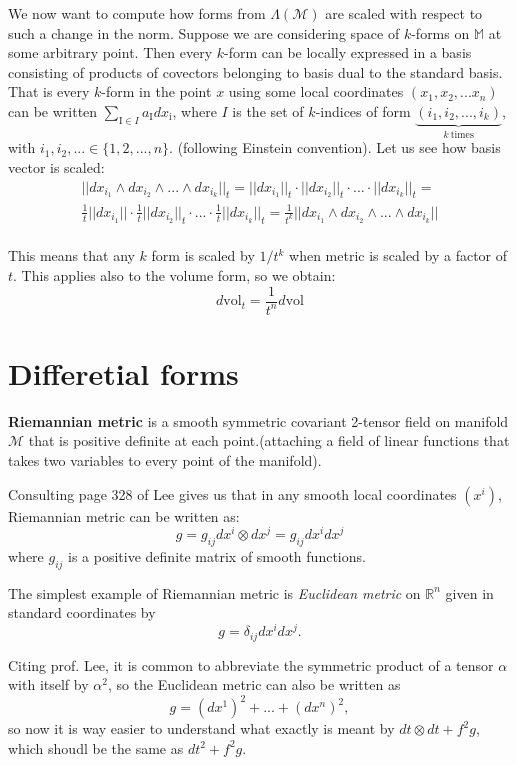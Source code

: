 \documentclass[licencjacka]{pracamgr}
\theoremstyle{definition}
\theoremstyle{definition}
\theoremstyle{plain}
\theoremstyle{plain}
\begin{document}
We now want to compute how forms from $\Lambda(\mathcal{M})$ are scaled
with respect to such a change in the norm. Suppose we are considering
space of $k$-forms on $\mathbb{M}$ at some arbitrary point. Then every
$k$-form can be locally expressed in a basis consisting of products of
covectors belonging to basis dual to the standard basis. That is every
$k$-form in the point $x$ using some local coordinates $(x_1, x_2,
... x_n)$ can be written $ \sum_{\mathrm{I} \in I } a_\mathrm{I}
dx_\mathrm{i}$, where $I$ is the set of $k$-indices of form
$\underbrace{(i_1, i_2, ..., i_k)}_{k~\mathrm{times}}$, with $i_1,
i_2, ... \in \{1, 2, ..., n \}$.  (following Einstein convention).
Let us see how basis vector is scaled:
\begin{multline*}
    ||dx_{i_1} \wedge dx_{i_2} \wedge ... \wedge dx_{i_k} ||_t =  
    ||dx_{i_1} ||_t \cdot ||  dx_{i_2} ||_t \cdot ... \cdot || dx_{i_k} ||_t =  \\
    \frac{1}{t}||dx_{i_1} || \cdot \frac{1}{t} ||  dx_{i_2} ||_t \cdot ...
     \cdot \frac{1}{t} || dx_{i_k} ||_t = 
    \frac{1}{t^k}||dx_{i_1} \wedge dx_{i_2} \wedge ... \wedge dx_{i_k} ||
\end{multline*} \\

This means that any $k$ form is scaled by $1/t^k$ when metric is scaled
by a factor of $t$.
This applies also to the volume form, so we obtain:
\[
d\mathrm{vol}_t = \frac{1}{t^n} d\mathrm{vol}
\]

\section{Differetial forms}

\textbf{Riemannian metric} is a smooth symmetric covariant 2-tensor field
on manifold $\mathcal{M}$ that is positive definite at each point.(attaching
a field of linear functions that takes two variables to every point of the
manifold).

Consulting page 328 of Lee gives us that in any smooth local coordinates
$(x^i)$, Riemannian metric can be written as:
\[
    g = g_{ij} dx^i \otimes dx^j = g_{ij} dx^i dx^j
\]
where $g_{ij}$ is a positive definite matrix of smooth functions. 

The simplest example of Riemannian metric is \emph{Euclidean metric} on
$\mathbb{R}^n$ given in standard coordinates by 
\[
    g = \delta_{ij}dx^idx^j.
\]

Citing prof. Lee, it is common to abbreviate the symmetric product of a tensor
$\alpha$ with itself by $\alpha^2$, so the Euclidean metric can also be written
as 
\[
    g = (dx^1)^2 + ...  + (dx^n)^2,
\]
so now it is way easier to understand what exactly is meant by
$ dt \otimes dt + f^2g $, which shoudl be the same as $dt^2 + f^2g$. \\
\end{document}
